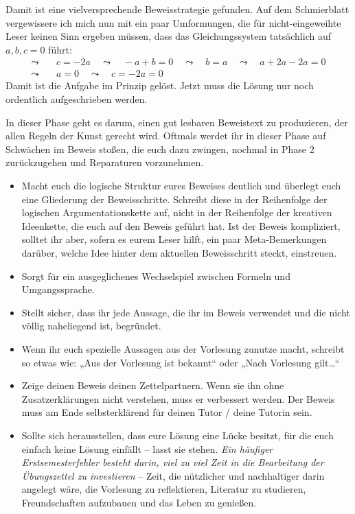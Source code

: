 \begin{phasetwo}[Rumprobieren]
    Damit ist eine vielversprechende Beweisstrategie gefunden. Auf dem Schmierblatt vergewissere ich mich nun mit ein paar Umformungen, die für nicht-eingeweihte Leser keinen Sinn ergeben müssen, dass das Gleichungssystem tatsächlich auf $a,b,c=0$ führt:
    \begingroup
    \allowdisplaybreaks
    \begin{align*}
        \leadsto\quad & c = -2a \quad\leadsto\quad -a + b = 0 \quad\leadsto\quad b = a \quad\leadsto\quad a +2a-2a = 0 \\
        \leadsto\quad & a = 0 \quad\leadsto\quad c = -2a=0
    \end{align*}
    \endgroup
    Damit ist die Aufgabe im Prinzip gelöst. Jetzt muss die Lösung nur noch ordentlich aufgeschrieben werden.
\end{phasetwo}


\begin{phasethree}[Aufschreiben]
    In dieser Phase geht es darum, einen gut lesbaren Beweistext zu produzieren, der allen Regeln der Kunst gerecht wird. Oftmals werdet ihr in dieser Phase auf Schwächen im Beweis stoßen, die euch dazu zwingen, nochmal in Phase 2 zurückzugehen und Reparaturen vorzunehmen.
    \begin{itemize}
        \item Macht euch die logische Struktur eures Beweises deutlich und überlegt euch eine Gliederung der Beweisschritte. Schreibt diese in der Reihenfolge der logischen Argumentationskette auf, nicht in der Reihenfolge der kreativen Ideenkette, die euch auf den Beweis geführt hat. Ist der Beweis kompliziert, solltet ihr aber, sofern es eurem Leser hilft, ein paar Meta-Bemerkungen darüber, welche Idee hinter dem aktuellen Beweisschritt steckt, einstreuen.
        \item Sorgt für ein ausgeglichenes Wechselspiel zwischen Formeln und Umgangssprache.
        \item Stellt sicher, dass ihr jede Aussage, die ihr im Beweis verwendet und die nicht völlig naheliegend ist, begründet.
        \item Wenn ihr euch spezielle Aussagen aus der Vorlesung zunutze macht, schreibt so etwas wie: „Aus der Vorlesung ist bekannt“ oder „Nach Vorlesung gilt\dots“
        \item Zeige deinen Beweis deinen Zettelpartnern. Wenn sie ihn ohne Zusatzerklärungen nicht verstehen, muss er verbessert werden. Der Beweis muss am Ende selbsterklärend für deinen Tutor / deine Tutorin sein.
        \item Sollte sich herausstellen, dass eure Lösung eine Lücke besitzt, für die euch einfach keine Lösung einfällt -- lasst sie stehen. \emph{Ein häufiger Erstsemesterfehler besteht darin, viel zu viel Zeit in die Bearbeitung der Übungszettel zu investieren} -- Zeit, die nützlicher und nachhaltiger darin angelegt wäre, die Vorlesung zu reflektieren, Literatur zu studieren, Freundschaften aufzubauen und das Leben zu genießen.

\end{itemize}
\end{phasethree}
